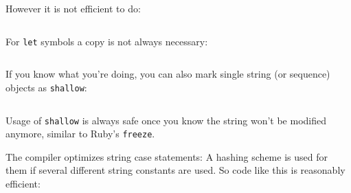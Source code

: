 \begin{verbatim}
\end{verbatim}

However it is not efficient to do:

\begin{verbatim}
\end{verbatim}

For \texttt{let} symbols a copy is not always necessary:

\begin{verbatim}
\end{verbatim}

If you know what you're doing, you can also mark single string (or
sequence) objects as \texttt{shallow}:

\begin{verbatim}
\end{verbatim}

Usage of \texttt{shallow} is always safe once you know the string won't
be modified anymore, similar to Ruby's \texttt{freeze}.

The compiler optimizes string case statements: A hashing scheme is used
for them if several different string constants are used. So code like
this is reasonably efficient:

\begin{verbatim}
\end{verbatim}
